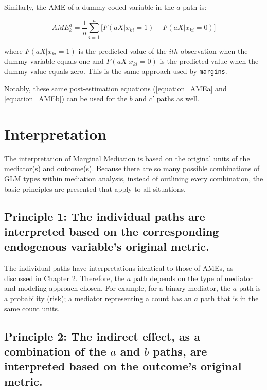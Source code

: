 \documentclass[]{DissertateUSU}
\begin{document}
Similarly, the AME of a dummy coded variable in the \(a\) path is:

\begin{equation}\label{equation_AMEb}
AME_{k}^a = \frac{1}{n} \sum_{i=1}^{n} \big[ F(a X | x_{ki} = 1) - F(a X | x_{ki} = 0) \big]
\end{equation}

\noindent where \(F(a X | x_{ki} = 1)\) is the predicted value of the
\(ith\) observation when the dummy variable equals one and
\(F(a X | x_{ki} = 0)\) is the predicted value when the dummy value
equals zero. This is the same approach used by \texttt{margins}.

Notably, these same post-estimation equations (\ref{equation_AMEa} and
\ref{equation_AMEb}) can be used for the \(b\) and \(c'\) paths as well.

\section{Interpretation}\label{interpretation-2}

The interpretation of Marginal Mediation is based on the original units
of the mediator(s) and outcome(s). Because there are so many possible
combinations of GLM types within mediation analysis, instead of
outlining every combination, the basic principles are presented that
apply to all situations.

\subsection{Principle 1: The individual paths are interpreted based on
the corresponding endogenous variable's original
metric.}\label{principle-1-the-individual-paths-are-interpreted-based-on-the-corresponding-endogenous-variables-original-metric.}

The individual paths have interpretations identical to those of AMEs, as
discussed in Chapter 2. Therefore, the \(a\) path depends on the type of
mediator and modeling approach chosen. For example, for a binary
mediator, the \(a\) path is a probability (risk); a mediator
representing a count has an \(a\) path that is in the same count units.

\subsection{\texorpdfstring{Principle 2: The indirect effect, as a
combination of the \(a\) and \(b\) paths, are interpreted based on the
outcome's original
metric.}{Principle 2: The indirect effect, as a combination of the a and b paths, are interpreted based on the outcome's original metric.}}\label{principle-2-the-indirect-effect-as-a-combination-of-the-a-and-b-paths-are-interpreted-based-on-the-outcomes-original-metric.}
\end{document}
